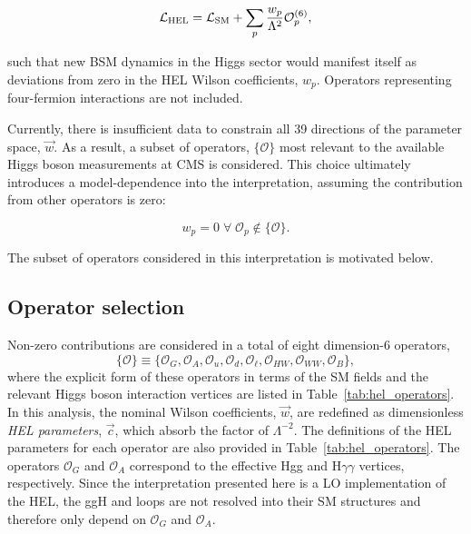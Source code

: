 \begin{equation}\label{eq:hel_expansion}
    \mathcal{L}_{\rm{HEL}} = \mathcal{L}_{\rm{SM}} + \sum_p \frac{w_p}{\Lambda^2}\mathcal{O}^{(6)}_p ,
\end{equation}

\noindent
such that new BSM dynamics in the Higgs sector would manifest itself as deviations from zero in the HEL Wilson coefficients, $w_p$. Operators representing four-fermion interactions are not included.

Currently, there is insufficient data to constrain all 39 directions of the parameter space, $\vec{w}$. As a result, a subset of operators, $\{\mathcal{O}\}$  most relevant to the available Higgs boson measurements at CMS is considered. This choice ultimately introduces a model-dependence into the interpretation, assuming the contribution from other operators is zero: 

\begin{equation}
  w_p=0 \; \forall \; \mathcal{O}_p \notin \{\mathcal{O}\}.   
\end{equation}

\noindent
The subset of operators considered in this interpretation is motivated below.

\subsection{Operator selection}\label{sec:eft_operator}
Non-zero contributions are considered in a total of eight dimension-6 operators,
\begin{equation}
    \{\mathcal{O}\} \equiv \{\mathcal{O}_G,\mathcal{O}_A,\mathcal{O}_u,\mathcal{O}_d,\mathcal{O}_\ell,\mathcal{O}_{HW},\mathcal{O}_{WW},\mathcal{O}_B\},
\end{equation}
\noindent
where the explicit form of these operators in terms of the SM fields and the relevant Higgs boson interaction vertices are listed in Table~\ref{tab:hel_operators}. In this analysis, the nominal Wilson coefficients, $\vec{w}$, are redefined as dimensionless \textit{HEL parameters}, $\vec{c}$, which absorb the factor of $\Lambda^{-2}$. The definitions of the HEL parameters for each operator are also provided in Table~\ref{tab:hel_operators}. The operators $\mathcal{O}_G$ and $\mathcal{O}_A$ correspond to the effective Hgg and H$\gamma\gamma$ vertices, respectively. Since the interpretation presented here is a LO implementation of the HEL, the ggH and \Hgg loops are not resolved into their SM structures and therefore only depend on $\mathcal{O}_G$ and $\mathcal{O}_A$.

